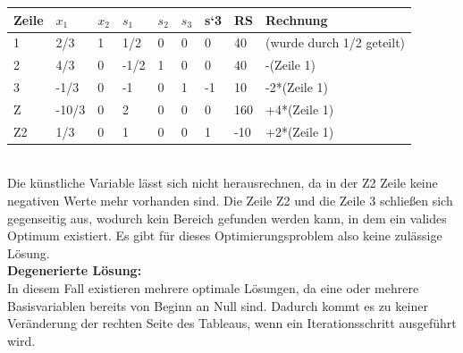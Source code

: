 \begin{table}[!ht]
\begin{tabular}{|l|l|l|l|l|l|l|l|l|}
\hline
\rowcolor[HTML]{C0C0C0} 
Zeile                      & $x_1$                            & $x_2$                        & $s_1$                           & $s_2$                        & $s_3$                        & s`3 & RS  & Rechnung                  \\ \hline
\cellcolor[HTML]{C0C0C0}1  & \cellcolor[HTML]{FFFFFF}2/3   & \cellcolor[HTML]{FFFFFF}1 & \cellcolor[HTML]{FFFFFF}1/2  & \cellcolor[HTML]{FFFFFF}0 & \cellcolor[HTML]{FFFFFF}0 & 0   & 40  & (wurde durch 1/2 geteilt) \\ \hline
\cellcolor[HTML]{C0C0C0}2  & \cellcolor[HTML]{FFFFFF}4/3   & \cellcolor[HTML]{FFFFFF}0 & \cellcolor[HTML]{FFFFFF}-1/2 & \cellcolor[HTML]{FFFFFF}1 & \cellcolor[HTML]{FFFFFF}0 & 0   & 40  & -(Zeile 1)                \\ \hline
\cellcolor[HTML]{C0C0C0}3  & \cellcolor[HTML]{FFFFFF}-1/3  & \cellcolor[HTML]{FFFFFF}0 & \cellcolor[HTML]{FFFFFF}-1   & \cellcolor[HTML]{FFFFFF}0 & \cellcolor[HTML]{FFFFFF}1 & -1  & 10  & -2*(Zeile 1)              \\ \hline
\cellcolor[HTML]{C0C0C0}Z  & \cellcolor[HTML]{FFFFFF}-10/3 & \cellcolor[HTML]{FFFFFF}0 & \cellcolor[HTML]{FFFFFF}2    & \cellcolor[HTML]{FFFFFF}0 & \cellcolor[HTML]{FFFFFF}0 & 0   & 160 & +4*(Zeile 1)              \\ \hline
\cellcolor[HTML]{C0C0C0}Z2 & 1/3                           & 0                         & 1                            & 0                         & 0                         & 1   & -10 & +2*(Zeile 1)              \\ \hline
\end{tabular}
\end{table}
\\
Die künstliche Variable lässt sich nicht herausrechnen, da in der Z2 Zeile keine negativen Werte mehr vorhanden sind. Die Zeile Z2 und die Zeile 3 schließen sich gegenseitig aus, wodurch kein Bereich gefunden werden kann, in dem ein valides Optimum existiert. Es gibt für dieses Optimierungsproblem also keine zulässige Lösung.\\
\textbf{Degenerierte Lösung: }\\
In diesem Fall existieren mehrere optimale Lösungen, da eine oder mehrere Basisvariablen bereits von Beginn an Null sind. Dadurch kommt es zu keiner Veränderung der rechten Seite des Tableaus, wenn ein Iterationsschritt ausgeführt wird.\\
